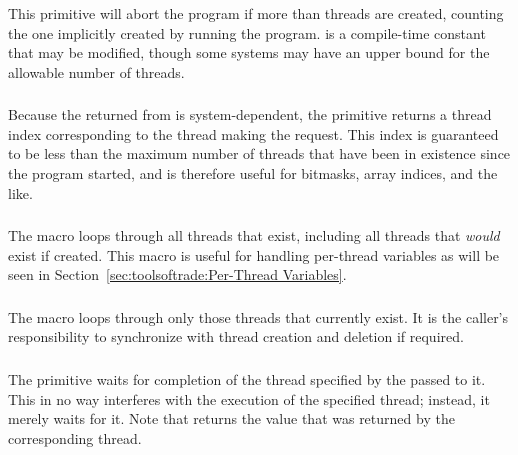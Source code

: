 This primitive will abort the program if more than 
threads are created, counting the one implicitly created by running
the program.
 is a compile-time constant that may be modified,
though some systems may have an upper bound for the allowable number
of threads.

\subsubsection{}

Because the  returned from  is
system-dependent, the  primitive returns a thread
index corresponding to the thread making the request.
This index is guaranteed to be less than the maximum number of threads
that have been in existence since the program started,
and is therefore useful for bitmasks, array indices, and
the like.

\subsubsection{}

The  macro loops through all threads that exist,
including all threads that \emph{would} exist if created.
This macro is useful for handling per-thread variables as will be
seen in Section~\ref{sec:toolsoftrade:Per-Thread Variables}.

\subsubsection{}

The 
macro loops through only those threads that currently exist.
It is the caller's responsibility to synchronize with thread
creation and deletion if required.

\subsubsection{}

The  primitive waits for completion of the thread
specified by the  passed to it.
This in no way interferes with the execution of the specified thread;
instead, it merely waits for it.
Note that  returns the value that was returned by
the corresponding thread.


